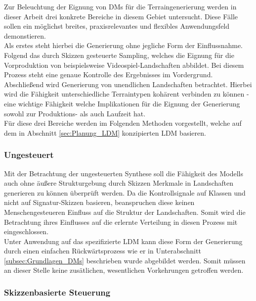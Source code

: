 Zur Beleuchtung der Eignung von DMs für die Terraingenerierung werden in dieser Arbeit drei konkrete Bereiche in diesem Gebiet untersucht. Diese Fälle sollen ein möglichst breites, praxisrelevantes und flexibles Anwendungsfeld demonstieren.\\
Als erstes steht hierbei die Generierung ohne jegliche Form der Einflussnahme. \\
Folgend das durch Skizzen gesteuerte Sampling, welches die Eignung für die Vorproduktion von beispielsweise Videospiel-Landschaften abbildet. Bei diesem Prozess steht eine genaue Kontrolle des Ergebnisses im Vordergrund. \\
Abschließend wird Generierung von unendlichen Landschaften betrachtet. Hierbei wird die Fähigkeit unterschiedliche Terraintypen kohärent verbinden zu können - eine wichtige Fähigkeit welche Implikationen für die Eignung der Generierung sowohl zur Produktions- als auch Laufzeit hat. \\
Für diese drei Bereiche werden im Folgenden Methoden vorgestellt, welche auf dem in Abschnitt \ref{sec:Planung_LDM} konzipierten \ac{LDM} basieren. 


\subsubsection {Ungesteuert}

Mit der Betrachtung der ungesteuerten Synthese soll die Fähigkeit des Modells auch ohne äußere Strukturgebung durch Skizzen Merkmale in Landschaften generieren zu können überprüft werden. Da die Kontrollsignale auf Klassen und nicht auf Signatur-Skizzen basieren, beanspruchen diese keinen Menschengesteueren Einfluss auf die Struktur der Landschaften. Somit wird die Betrachtung ihres Einflusses auf die erlernte Verteilung in diesen Prozess mit eingeschlossen. \\
Unter Anwendung auf das spezifizierte \ac{LDM} kann diese Form der Generierung durch einen einfachen Rückwärtsprozess wie er in Unterabschnitt \ref{subsec:Grundlagen_DMs} beschrieben wurde abgebildet werden. Somit müssen an dieser Stelle keine zusätlichen, wesentlichen Vorkehrungen getroffen werden. 

\subsubsection {Skizzenbasierte Steuerung}

